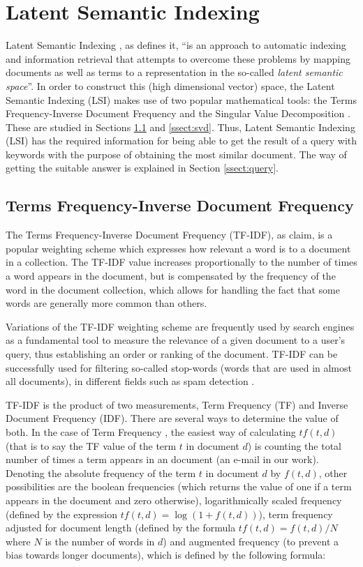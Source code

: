 \section{Latent Semantic Indexing}\label{sect:lsi}
Latent Semantic Indexing \citep{deerwester1990indexing, dumais1995latent}, as \cite{hofmann1999probabilistic} defines it, ``is an approach to automatic indexing and information retrieval that attempts to overcome these problems by mapping documents as well as terms to a representation in the so-called \textit{latent semantic space}''. In order to construct this (high dimensional vector) space, the Latent Semantic Indexing (LSI) makes use of two popular mathematical tools: the Terms Frequency-Inverse Document Frequency \citep{chowdhury2010introduction} and the Singular Value Decomposition \citep{golub1971singular}. These are studied in Sections \ref{ssect:tfidf} and \ref{ssect:svd}. Thus, Latent Semantic Indexing (LSI) has the required information for being able to get the result of a query with keywords with the purpose of obtaining the most similar document. The way of getting the suitable answer is explained in Section \ref{ssect:query}.

\subsection{Terms Frequency-Inverse Document Frequency}\label{ssect:tfidf}
The Terms Frequency-Inverse Document Frequency (TF-IDF), as \cite{tang2014email} claim, is a popular weighting scheme which expresses how relevant a word is to a document in a collection. The TF-IDF value increases proportionally to the number of times a word appears in the document, but is compensated by the frequency of the word in the document collection, which allows for handling the fact that some words are generally more common than others.

Variations of the TF-IDF weighting scheme are frequently used by search engines as a fundamental tool to measure the relevance of a given document to a user's query, thus establishing an order or ranking of the document. TF-IDF can be successfully used for filtering so-called stop-words (words that are used in almost all documents), in different fields such as spam detection \citep{sasaki2005spam}.

TF-IDF is the product of two measurements, Term Frequency (TF) and Inverse Document Frequency (IDF). There are several ways to determine the value of both. In the case of Term Frequency \citep{jones1972statistical}, the easiest way of calculating $tf(t, d)$ (that is to say the TF value of the term $t$ in document $d$) is counting the total number of times a term appears in an document (an e-mail in our work). Denoting the absolute frequency of the term $t$ in document $d$ by $f(t,d)$, other possibilities are the boolean frequencies (which returns the value of one if a term appears in the document and zero otherwise), logarithmically scaled frequency (defined by the expression $tf(t,d)=\log(1+f(t,d))$), term frequency adjusted for document length (defined by the formula $tf(t,d)=f(t,d)/N$ where $N$ is the number of words in $d$) and augmented frequency (to prevent a bias towards longer documents), which is defined by the following formula:


